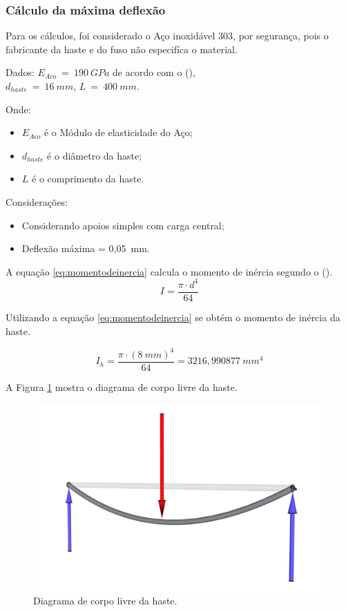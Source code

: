 \subsubsection{Cálculo da máxima deflexão}

Para os cálculos, foi considerado o Aço inoxidável 303, por segurança, pois o fabricante da haste e do fuso 
não especifíca o material.

Dados: 
$E_{Aco}~=~190~GPa$ de acordo com o \citeauthor{juvinall2020fundamentals} (\citeyear{juvinall2020fundamentals}),\\
$d_{haste}~=~16~mm$, $L~=~400~mm$.

Onde:
\begin{itemize}
    \item $E_{Aco}$ é o Módulo de elasticidade do Aço;
    \item $d_{haste}$ é o diâmetro da haste;
    \item $L$ é o comprimento da haste.
\end{itemize}

Considerações:
\begin{itemize}
    \item Considerando apoios simples com carga central;
    \item Deflexão máxima = 0,05~mm.
\end{itemize}

A equação \ref{eq:momentodeinercia} calcula o momento de inércia segundo o \citeauthor{juvinall2020fundamentals} (\citeyear{juvinall2020fundamentals}).
\begin{equation}\label{eq:momentodeinercia}
    I = \frac{\pi \cdot d^{4}}{64}
\end{equation}

Utilizando a equação \ref{eq:momentodeinercia} se obtém o momento de inércia da haste.

$$I_{h} = \frac{\pi \cdot (8~mm)^{4}}{64} = 3216,990877~mm^{4}$$   

A Figura \ref{fig:diagramacorpolivre} mostra o diagrama de corpo livre da haste.

\begin{figure}[H]
\centering
\caption{Diagrama de corpo livre da haste.}\label{fig:diagramacorpolivre}
\includegraphics[scale = 0.4]{figuras/diagramcorpolivre}
\end{figure}

